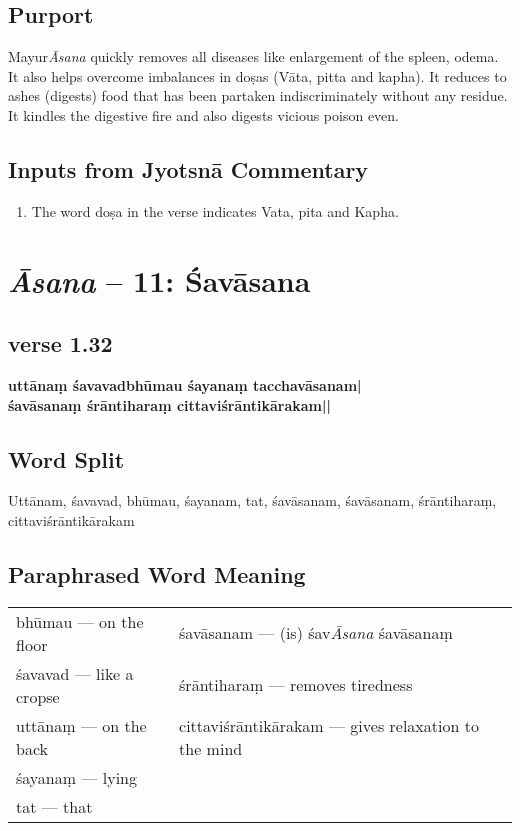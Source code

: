 \subsection*{Purport}

Mayur\textit{Āsana} quickly removes all diseases like enlargement of the spleen, odema. It also helps overcome imbalances in doṣas (Vāta, pitta and kapha). It reduces to ashes (digests) food that has been partaken indiscriminately without any residue. It kindles the digestive fire and also digests vicious poison even. 

\subsection*{Inputs from Jyotsnā Commentary}

\begin{enumerate}
\item The word doṣa in the verse indicates Vata, pita and Kapha.
\end{enumerate}
\newpage

\section*{\textit{Āsana} -- 11: Śavāsana}

\subsection*{verse 1.32}

\begin{shloka}
\textbf{uttānaṃ śavavadbhūmau śayanaṃ tacchavāsanam|}\\
\textbf{śavāsanaṃ śrāntiharaṃ cittaviśrāntikārakam||}
\end{shloka}

\subsection*{Word Split}

Uttānam, śavavad, bhūmau, śayanam, tat, śavāsanam, śavāsanam, śrāntiharaṃ, cittaviśrāntikārakam

\subsection*{Paraphrased Word Meaning}

\begin{longtable}{>{\noindent\raggedright}p{5cm}>{\noindent\raggedright}p{5cm}}
bhūmau --- on the floor  & śavāsanam --- (is) śav\textit{Āsana} śavāsanaṃ\tabularnewline
śavavad  --- like a cropse  & śrāntiharaṃ --- removes tiredness\tabularnewline
uttānaṃ --- on the back  & cittaviśrāntikārakam --- gives relaxation to the mind\tabularnewline
śayanaṃ --- lying  & \tabularnewline
tat --- that  & 
\end{longtable}

